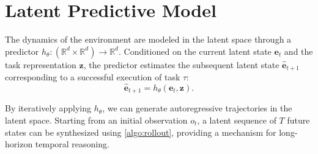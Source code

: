 
\section{Latent Predictive Model}
\label{sec:latent_predictive_model}

The dynamics of the environment are modeled in the latent space through a predictor $h_\theta: (\mathbb{R}^d \times \mathbb{R}^d) \to \mathbb{R}^d$. Conditioned on the current latent state \( \mathbf{e}_t \) and the task representation \( \mathbf{z} \), the predictor estimates the subsequent latent state \( \hat{\mathbf{e}}_{t+1} \) corresponding to a successful execution of task \( \tau \):
\begin{equation}
	\hat{\mathbf{e}}_{t+1} = h_\theta(\mathbf{e}_t, \mathbf{z}) .
	\label{eq:predictor}
\end{equation}

By iteratively applying $h_\theta$, we can generate autoregressive trajectories in the latent space. Starting from an initial observation \( o_t \), a latent sequence of \( T \) future states can be synthesized using \cref{algo:rollout}, providing a mechanism for long-horizon temporal reasoning.

\begin{algorithm}
	\caption{\textsc{Rollout}$(\mathbf{e}_t, \mathbf{z}, h_\theta, T)$}
	\label{algo:rollout}

\end{algorithm}


